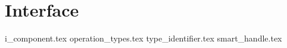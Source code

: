 \section{Interface}
{i_component.tex}
{operation_types.tex}
{type_identifier.tex}
{smart_handle.tex}

